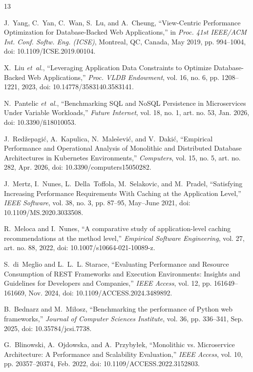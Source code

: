 \documentclass[conference]{IEEEtran}
\begin{document}
\begin{thebibliography}{13}
\footnotesize
\setlength{\itemsep}{0pt}
\setlength{\parskip}{0pt}

J.~Yang, C.~Yan, C.~Wan, S.~Lu, and A.~Cheung, ``View-Centric Performance Optimization for Database-Backed Web Applications,'' in \emph{Proc. 41st IEEE/ACM Int. Conf. Softw. Eng. (ICSE)}, Montreal, QC, Canada, May 2019, pp. 994--1004, doi: 10.1109/ICSE.2019.00104.

X.~Liu \emph{et~al.}, ``Leveraging Application Data Constraints to Optimize Database-Backed Web Applications,'' \emph{Proc. VLDB Endowment}, vol. 16, no. 6, pp. 1208--1221, 2023, doi: 10.14778/3583140.3583141.

N.~Pantelic \emph{et~al.}, ``Benchmarking SQL and NoSQL Persistence in Microservices Under Variable Workloads,'' \emph{Future Internet}, vol. 18, no. 1, art. no. 53, Jan. 2026, doi: 10.3390/fi18010053.

J.~Redžepagić, A.~Kapulica, N.~Malešević, and V.~Dakić, ``Empirical Performance and Operational Analysis of Monolithic and Distributed Database Architectures in Kubernetes Environments,'' \emph{Computers}, vol. 15, no. 5, art. no. 282, Apr. 2026, doi: 10.3390/computers15050282.

J.~Mertz, I.~Nunes, L.~Della~Toffola, M.~Selakovic, and M.~Pradel, ``Satisfying Increasing Performance Requirements With Caching at the Application Level,'' \emph{IEEE Software}, vol. 38, no. 3, pp. 87--95, May--June 2021, doi: 10.1109/MS.2020.3033508.

R.~Meloca and I.~Nunes, ``A comparative study of application-level caching recommendations at the method level,'' \emph{Empirical Software Engineering}, vol. 27, art. no. 88, 2022, doi: 10.1007/s10664-021-10089-z.

S.~di~Meglio and L.~L.~L. Starace, ``Evaluating Performance and Resource Consumption of REST Frameworks and Execution Environments: Insights and Guidelines for Developers and Companies,'' \emph{IEEE Access}, vol. 12, pp. 161649--161669, Nov. 2024, doi: 10.1109/ACCESS.2024.3489892.

B.~Bednarz and M.~Miłosz, ``Benchmarking the performance of Python web frameworks,'' \emph{Journal of Computer Sciences Institute}, vol. 36, pp. 336--341, Sep. 2025, doi: 10.35784/jcsi.7738.

G.~Blinowski, A.~Ojdowska, and A.~Przybyłek, ``Monolithic vs. Microservice Architecture: A Performance and Scalability Evaluation,'' \emph{IEEE Access}, vol. 10, pp. 20357--20374, Feb. 2022, doi: 10.1109/ACCESS.2022.3152803.


\end{thebibliography}
\end{document}
